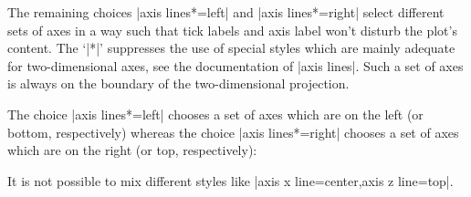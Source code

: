{\begin{codeexample}[]
\end{codeexample}

The remaining choices |axis lines*=left| and |axis lines*=right| select different sets of axes in a way such that tick labels and axis label won't disturb the plot's content. The `|*|' suppresses the use of special styles which are mainly adequate for two-dimensional axes, see the documentation of |axis lines|. Such a set of axes is always on the boundary of the two-dimensional projection.  

The choice |axis lines*=left| chooses a set of axes which are on the left (or bottom, respectively) whereas the choice |axis lines*=right| chooses a set of axes which are on the right (or top, respectively):

\begin{codeexample}[]
\end{codeexample}

\begin{codeexample}[]
\end{codeexample}

It is not possible to mix different styles like |axis x line=center,axis z line=top|.

}
